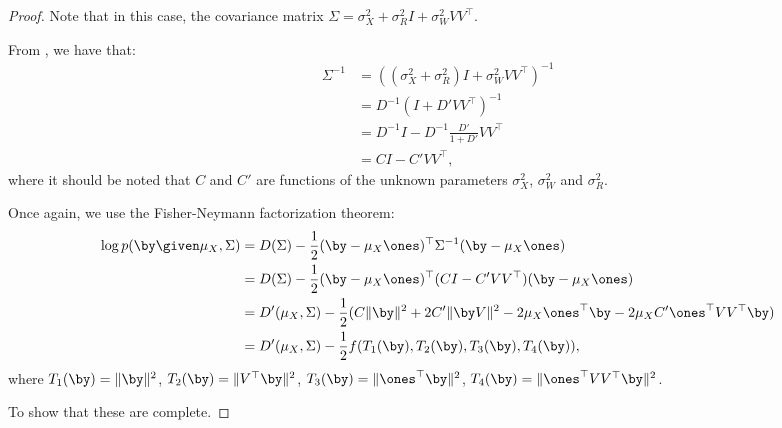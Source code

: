 \begin{proof}
  Note that in this case, the covariance matrix $\Sigma = \sigma^2_X + \sigma^2_R I + \sigma^2_W V V^\top$.

  From , we have that: 
  \begin{align*}
    \Sigma^{-1} 
      &= ((\sigma^2_X + \sigma^2_R) I + \sigma^2_W V V^\top)^{-1} \\
      &= D^{-1}(I + D' V V^\top)^{-1} \\
      &= D^{-1} I - D^{-1} \frac{D'}{1+D'} V V^\top \\
      &= C I - C' V V^\top,
  \end{align*}
  where it should be noted that $C$ and $C'$ are functions of the unknown parameters $\sigma^2_X$, $\sigma^2_W$ and $\sigma^2_R$.

  Once again, we use the Fisher-Neymann factorization theorem:
  \begin{align*}
  \log p(\by \given \mu_X, \Sigma) 
      &= D(\Sigma) - \frac{1}{2} (\by - \mu_X \ones)^\top \Sigma^{-1}  (\by - \mu_X \ones) \\
      &= D(\Sigma) - \frac{1}{2} (\by - \mu_X \ones)^\top (CI - C' VV^\top) (\by - \mu_X \ones) \\
      &= D'(\mu_X, \Sigma) - \frac{1}{2} (C \|\by\|^2 + 2 C' \|\by V\|^2 - 2 \mu_X \ones^\top \by - 2 \mu_X C' \ones^\top V V^\top \by)\\
      &= D'(\mu_X, \Sigma) - \frac{1}{2} f(T_1(\by), T_2(\by), T_3(\by), T_4(\by)),
  \end{align*}
  where 
    $T_1(\by) = \|\by\|^2$,
    $T_2(\by) = \|V^\top \by\|^2$,
    $T_3(\by) = \|\ones^\top \by\|^2$,
    $T_4(\by) = \|\ones^\top V V^\top \by\|^2$.

  \ac{To show that these are complete.}
\end{proof}

